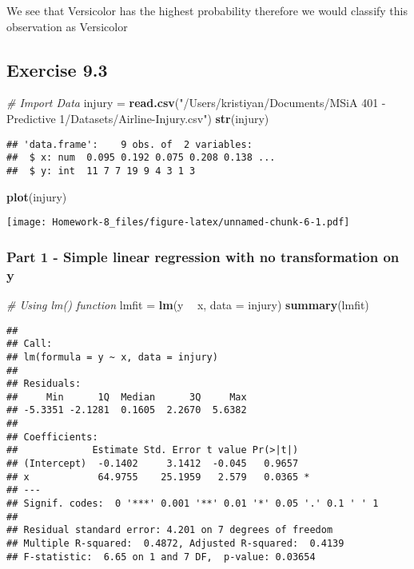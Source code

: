 \documentclass[]{article}
\newenvironment{Shaded}{\begin{snugshade}}{\end{snugshade}}
\newcommand{\CommentTok}[1]{\textcolor[rgb]{0.56,0.35,0.01}{\textit{#1}}}
\newcommand{\DataTypeTok}[1]{\textcolor[rgb]{0.13,0.29,0.53}{#1}}
\newcommand{\KeywordTok}[1]{\textcolor[rgb]{0.13,0.29,0.53}{\textbf{#1}}}
\newcommand{\NormalTok}[1]{#1}
\newcommand{\OperatorTok}[1]{\textcolor[rgb]{0.81,0.36,0.00}{\textbf{#1}}}
\newcommand{\StringTok}[1]{\textcolor[rgb]{0.31,0.60,0.02}{#1}}
\begin{document}
We see that Versicolor has the highest probability therefore we would
classify this observation as Versicolor

\hypertarget{exercise-9.3}{%
\subsection{Exercise 9.3}\label{exercise-9.3}}

\begin{Shaded}
\begin{Highlighting}[]
\CommentTok{# Import Data}
\NormalTok{injury =}\StringTok{ }\KeywordTok{read.csv}\NormalTok{(}\StringTok{"/Users/kristiyan/Documents/MSiA 401 - Predictive 1/Datasets/Airline-Injury.csv"}\NormalTok{)}
\KeywordTok{str}\NormalTok{(injury)}
\end{Highlighting}
\end{Shaded}

\begin{verbatim}
## 'data.frame':    9 obs. of  2 variables:
##  $ x: num  0.095 0.192 0.075 0.208 0.138 ...
##  $ y: int  11 7 7 19 9 4 3 1 3
\end{verbatim}

\begin{Shaded}
\begin{Highlighting}[]
\KeywordTok{plot}\NormalTok{(injury)}
\end{Highlighting}
\end{Shaded}

\texttt{[image: Homework-8\_files/figure-latex/unnamed-chunk-6-1.pdf]}

\hypertarget{part-1---simple-linear-regression-with-no-transformation-on-y}{%
\subsubsection{Part 1 - Simple linear regression with no transformation
on
y}\label{part-1---simple-linear-regression-with-no-transformation-on-y}}

\begin{Shaded}
\begin{Highlighting}[]
\CommentTok{# Using lm() function}
\NormalTok{lmfit =}\StringTok{ }\KeywordTok{lm}\NormalTok{(y }\OperatorTok{~}\StringTok{ }\NormalTok{x, }\DataTypeTok{data =}\NormalTok{ injury)}
\KeywordTok{summary}\NormalTok{(lmfit)}
\end{Highlighting}
\end{Shaded}

\begin{verbatim}
## 
## Call:
## lm(formula = y ~ x, data = injury)
## 
## Residuals:
##     Min      1Q  Median      3Q     Max 
## -5.3351 -2.1281  0.1605  2.2670  5.6382 
## 
## Coefficients:
##             Estimate Std. Error t value Pr(>|t|)  
## (Intercept)  -0.1402     3.1412  -0.045   0.9657  
## x            64.9755    25.1959   2.579   0.0365 *
## ---
## Signif. codes:  0 '***' 0.001 '**' 0.01 '*' 0.05 '.' 0.1 ' ' 1
## 
## Residual standard error: 4.201 on 7 degrees of freedom
## Multiple R-squared:  0.4872, Adjusted R-squared:  0.4139 
## F-statistic:  6.65 on 1 and 7 DF,  p-value: 0.03654
\end{verbatim}
\end{document}
